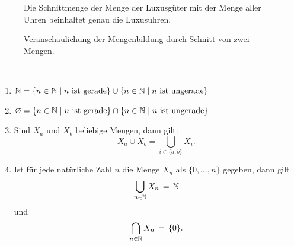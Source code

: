 \begin{figure}[h]
\begin{bsp}
Die Schnittmenge der Menge der Luxusgüter mit der Menge aller Uhren beinhaltet genau die Luxusuhren.
\begin{center}
\begin{framed}
\def\firstcircle{(0,0) circle (1.8cm)}
\def\secondcircle{(2.5,0) circle (1.8cm)}



\setlength{\parskip}{5mm}

\caption*{Veranschaulichung der Mengenbildung durch Schnitt von zwei Mengen.}
\end{framed}
\end{center}
\end{bsp}
\end{figure}

\begin{bsp}\label{bsp:vereinSchnitt}~
\begin{enumerate}
\item $\mathbb{N}=\{n\in \mathbb{N}\mid n\text{ ist gerade}\}\cup \{n\in \mathbb{N}\mid n\text{ ist ungerade}\}$
\item $\varnothing=\{n\in \mathbb{N}\mid n\text{ ist gerade}\}\cap \{n\in \mathbb{N}\mid n\text{ ist ungerade}\}$
\item Sind $X_a$ und $X_b$ beliebige Mengen, dann gilt:
\[
X_a\cup X_b=\bigcup_{i\in\{a,b\}}X_i.
\]
\item Ist für jede natürliche Zahl $n$ die Menge $X_n$ als $\{0,\dots, n\}$ gegeben, dann gilt
\[
\bigcup_{n\in \mathbb{N}}X_n\,=\,\mathbb{N}
\]
und
\[
\bigcap_{n\in \mathbb{N}}X_n\,=\,\{0\}.
\]
\end{enumerate}
\end{bsp}


